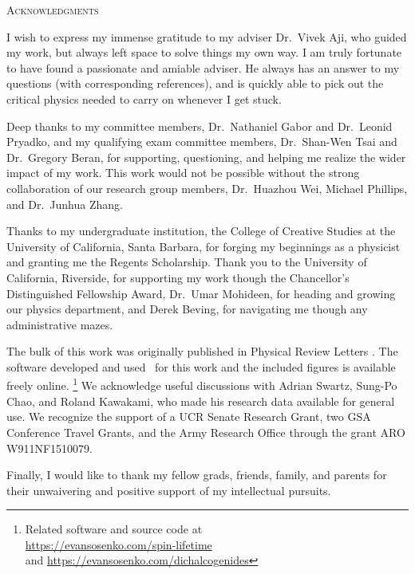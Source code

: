 \clearpage
\centering
\vspace*{-\toptafiddle}

\textsc{Acknowledgments}

\justify{}
\DoubleSpacing{}
I wish to express my immense gratitude to my adviser Dr.\ Vivek Aji,
who guided my work, but always left space to solve things my own way.
I am truly fortunate to have found a passionate and amiable adviser.
He always has an answer to my questions (with corresponding references),
and is quickly able to pick out the critical physics
needed to carry on whenever I get stuck.

Deep thanks to my committee members,
Dr.\ Nathaniel Gabor and Dr.\ Leonid Pryadko,
and my qualifying exam committee members,
Dr.\ Shan-Wen Tsai and Dr.\ Gregory Beran,
for supporting, questioning,
and helping me realize the wider impact of my work.
This work would not be possible without the strong collaboration
of our research group members, Dr.\ Huazhou Wei, Michael Phillips,
and Dr.\ Junhua Zhang.

Thanks to my undergraduate institution,
the College of Creative Studies at
the University of California, Santa Barbara,
for forging my beginnings as a physicist
and granting me the Regents Scholarship.
Thank you to the University of California, Riverside,
for supporting my work though the
Chancellor's Distinguished Fellowship Award,
Dr.\ Umar Mohideen, for heading and growing our physics department,
and Derek Beving, for navigating me though any administrative mazes.

The bulk of this work was originally published in
Physical Review Letters
\cite{%
  PhysRevB.89.245436,%
  1512.01261v2%
}.
The software developed
and used~\cite{Hunter:2007} for this work
and the included figures is available freely online.%
\footnote{%
  Related software and source code at \\
  \url{https://evansosenko.com/spin-lifetime}
  \\
  and \url{https://evansosenko.com/dichalcogenides}
}
We acknowledge useful discussions with
Adrian Swartz, Sung-Po Chao, and Roland Kawakami,
who made his research data available for general use.
We recognize the support of a UCR Senate Research Grant,
two GSA Conference Travel Grants,
and the Army Research Office through the grant
ARO W911NF1510079.

Finally, I would like to thank my fellow grads, friends, family, and parents
for their unwaivering and positive support of my intellectual pursuits.
\enlargethispage{\bottafiddle}
\clearpage
